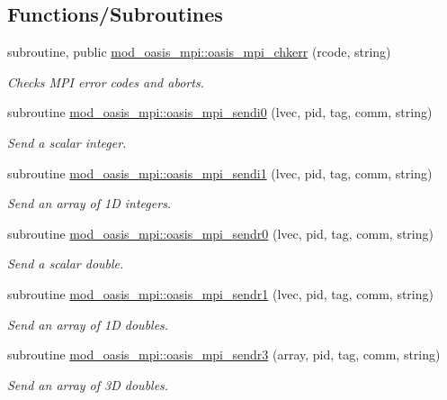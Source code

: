 \subsection*{Functions/\+Subroutines}
\begin{DoxyCompactItemize}
\item 
subroutine, public \hyperlink{namespacemod__oasis__mpi_a15ba68764a1f4dd07d403e46afae824c}{mod\+\_\+oasis\+\_\+mpi\+::oasis\+\_\+mpi\+\_\+chkerr} (rcode, string)
\begin{DoxyCompactList}\small\item\em Checks M\+PI error codes and aborts. \end{DoxyCompactList}\item 
subroutine \hyperlink{namespacemod__oasis__mpi_aa5078962eee157f52878f711c0a29afb}{mod\+\_\+oasis\+\_\+mpi\+::oasis\+\_\+mpi\+\_\+sendi0} (lvec, pid, tag, comm, string)
\begin{DoxyCompactList}\small\item\em Send a scalar integer. \end{DoxyCompactList}\item 
subroutine \hyperlink{namespacemod__oasis__mpi_aab4cc0d2b50e8e73697e6d88d23b03cd}{mod\+\_\+oasis\+\_\+mpi\+::oasis\+\_\+mpi\+\_\+sendi1} (lvec, pid, tag, comm, string)
\begin{DoxyCompactList}\small\item\em Send an array of 1D integers. \end{DoxyCompactList}\item 
subroutine \hyperlink{namespacemod__oasis__mpi_ab38f15fbce57555ea66ccbc1aa477dd1}{mod\+\_\+oasis\+\_\+mpi\+::oasis\+\_\+mpi\+\_\+sendr0} (lvec, pid, tag, comm, string)
\begin{DoxyCompactList}\small\item\em Send a scalar double. \end{DoxyCompactList}\item 
subroutine \hyperlink{namespacemod__oasis__mpi_a948cd001c0955ae19f4b410d4cca9f9b}{mod\+\_\+oasis\+\_\+mpi\+::oasis\+\_\+mpi\+\_\+sendr1} (lvec, pid, tag, comm, string)
\begin{DoxyCompactList}\small\item\em Send an array of 1D doubles. \end{DoxyCompactList}\item 
subroutine \hyperlink{namespacemod__oasis__mpi_ac8809a8b29b3ffa246612b9c25cd05eb}{mod\+\_\+oasis\+\_\+mpi\+::oasis\+\_\+mpi\+\_\+sendr3} (array, pid, tag, comm, string)
\begin{DoxyCompactList}\small\item\em Send an array of 3D doubles. \end{DoxyCompactList}\item 

\end{DoxyCompactItemize}
